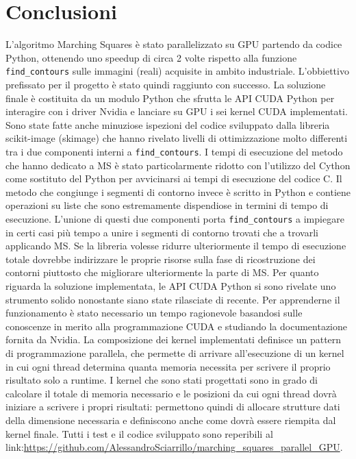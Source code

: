 \documentclass[12pt,a4paper]{report}
\begin{document}
{\chapter{Conclusioni}
L'algoritmo Marching Squares è stato parallelizzato su GPU partendo da codice Python, ottenendo uno speedup di circa 2 volte rispetto alla funzione \verb|find_contours| sulle immagini (reali) acquisite in ambito industriale.
L'obbiettivo prefissato per il progetto è stato quindi raggiunto con successo. \newline
La soluzione finale è costituita da un modulo Python che sfrutta le API CUDA Python per interagire con i driver Nvidia e lanciare su GPU i sei kernel CUDA implementati.
Sono state fatte anche minuziose ispezioni del codice sviluppato dalla libreria scikit-image (skimage) che hanno rivelato livelli di ottimizzazione molto differenti tra i due componenti interni a \verb|find_contours|. I tempi di esecuzione del metodo che hanno dedicato a MS è stato particolarmente ridotto con l'utilizzo del Cython come sostituto del Python per avvicinarsi ai tempi di esecuzione del codice C. Il metodo che congiunge i segmenti di contorno invece è scritto in Python e contiene operazioni su liste che sono estremamente dispendiose in termini di tempo di esecuzione. L'unione di questi due componenti porta \verb|find_contours| a impiegare in certi casi più tempo a unire i segmenti di contorno trovati che a trovarli applicando MS. Se la libreria volesse ridurre ulteriormente il tempo di esecuzione totale dovrebbe indirizzare le proprie risorse sulla fase di ricostruzione dei contorni piuttosto che migliorare ulteriormente la parte di MS. \newline
Per quanto riguarda la soluzione implementata, le API CUDA Python si sono rivelate uno strumento solido nonostante siano state rilasciate di recente. Per apprenderne il funzionamento è stato necessario un tempo ragionevole basandosi sulle conoscenze in merito alla programmazione CUDA e studiando la documentazione fornita da Nvidia.\newline
La composizione dei kernel implementati definisce un pattern di programmazione parallela, che permette di arrivare all'esecuzione di un kernel in cui ogni thread determina quanta memoria necessita per scrivere il proprio risultato solo a runtime. I kernel che sono stati progettati sono in grado di calcolare il totale di memoria necessario e le posizioni da cui ogni thread dovrà iniziare a scrivere i propri risultati: permettono quindi di allocare strutture dati della dimensione necessaria e definiscono anche come dovrà essere riempita dal kernel finale. \newline
Tutti i test e il codice sviluppato sono reperibili al link:\newline \url{https://github.com/AlessandroSciarrillo/marching_squares_parallel_GPU}.


}
\end{document}
